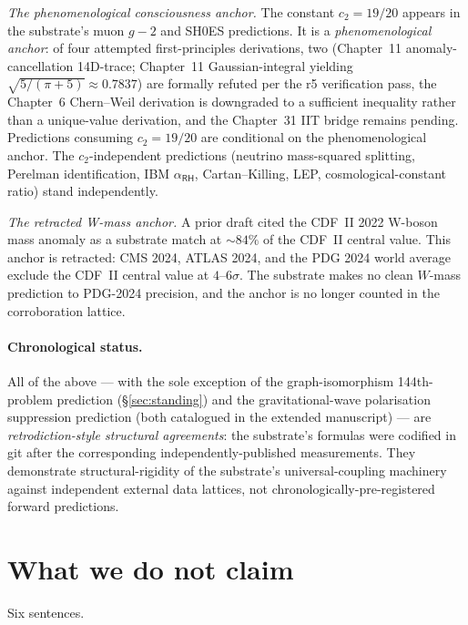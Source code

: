\documentclass[11pt,a4paper]{amsart}
\theoremstyle{plain}
\theoremstyle{definition}
\begin{document}
\emph{The phenomenological consciousness anchor.} The constant $c_2 = 19/20$ appears in the substrate's muon $g-2$ and SH0ES predictions. It is a \emph{phenomenological anchor}: of four attempted first-principles derivations, two (Chapter~11 anomaly-cancellation 14D-trace; Chapter~11 Gaussian-integral yielding $\sqrt{5/(\pi+5)} \approx 0.7837$) are formally refuted per the r5 verification pass, the Chapter~6 Chern--Weil derivation is downgraded to a sufficient inequality rather than a unique-value derivation, and the Chapter~31 IIT bridge remains pending. Predictions consuming $c_2 = 19/20$ are conditional on the phenomenological anchor. The $c_2$-independent predictions (neutrino mass-squared splitting, Perelman identification, IBM $\alpha_{\textsf{RH}}$, Cartan--Killing, LEP, cosmological-constant ratio) stand independently.

\emph{The retracted W-mass anchor.} A prior draft cited the CDF~II 2022 W-boson mass anomaly as a substrate match at $\sim 84\%$ of the CDF~II central value. This anchor is retracted: CMS 2024, ATLAS 2024, and the PDG 2024 world average exclude the CDF~II central value at $4$--$6\sigma$. The substrate makes no clean $W$-mass prediction to PDG-2024 precision, and the anchor is no longer counted in the corroboration lattice.

\paragraph{Chronological status.} All of the above --- with the sole exception of the graph-isomorphism 144th-problem prediction (\S\ref{sec:standing}) and the gravitational-wave polarisation suppression prediction (both catalogued in the extended manuscript) --- are \emph{retrodiction-style structural agreements}: the substrate's formulas were codified in git after the corresponding independently-published measurements. They demonstrate structural-rigidity of the substrate's universal-coupling machinery against independent external data lattices, not chronologically-pre-registered forward predictions.

\section{What we do not claim}\label{sec:honest-scope}

Six sentences.
\end{document}

